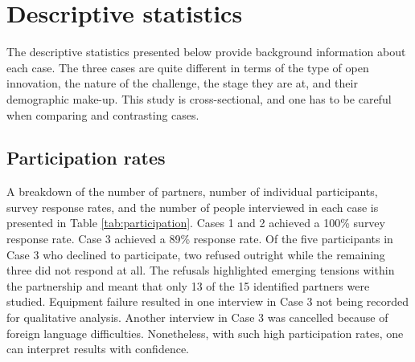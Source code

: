 \section{Descriptive statistics}

The descriptive statistics presented below provide background information about each case. The three cases are quite different in terms of the type of open innovation, the nature of the challenge, the stage they are at, and their demographic make-up. This study is cross-sectional, and one has to be careful when comparing and contrasting cases.

\subsection{Participation rates}

A breakdown of the number of partners, number of individual participants, survey response rates, and the number of people interviewed in each case is presented in Table \ref{tab:participation}. Cases 1 and 2 achieved a 100\% survey response rate. Case 3 achieved a 89\% response rate. Of the five participants in Case 3 who declined to participate, two refused outright while the remaining three did not respond at all. The refusals highlighted emerging tensions within the partnership and meant that only 13 of the 15 identified partners were studied. Equipment failure resulted in one interview in Case 3 not being recorded for qualitative analysis. Another interview in Case 3 was cancelled because of foreign language difficulties. Nonetheless, with such high participation rates, one can interpret results with confidence. \medskip

\begin{table}[hbt!]
\centering
{}
\end{table}

